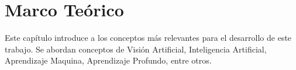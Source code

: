 
\chapter{Marco Teórico}

Este capítulo introduce a los conceptos más relevantes para el desarrollo de este trabajo. Se abordan conceptos de Visión Artificial, Inteligencia Artificial, Aprendizaje Maquina, Aprendizaje Profundo, entre otros.






